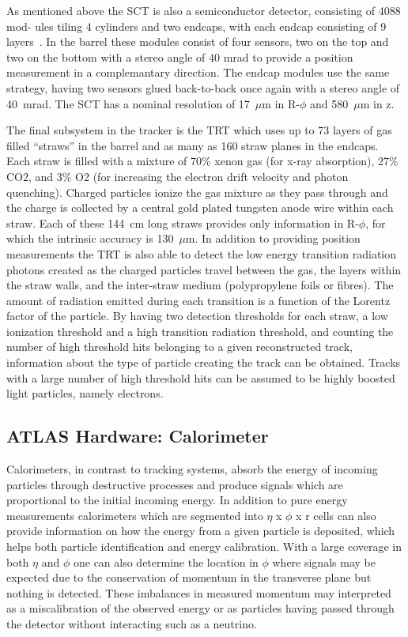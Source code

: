 As mentioned above the SCT is also a semiconductor detector, consisting of 4088 mod- ules tiling 4 cylinders and two endcaps, with each endcap consisting of 9 layers~\cite{JOIATLAS}.  
In the barrel these modules consist of four sensors, two on the top and two on the bottom with a stereo angle of 40 mrad to provide a position measurement in a complemantary direction.  
The endcap modules use the same strategy, having two sensors glued back-to-back once again with a stereo angle of 40~mrad.  
The SCT has a nominal resolution of 17~$\mu$m in R-$\phi$ and 580~$\mu$m in z.  

The final subsystem in the tracker is the TRT which uses up to 73 layers of gas filled ``straws'' in the barrel and as many as 160 straw planes in the endcaps.  
Each straw is filled with a mixture of 70\% xenon gas (for x-ray absorption), 27\% CO2, and 3\% O2 (for increasing the electron drift velocity and photon quenching).  
Charged particles ionize the gas mixture as they pass through and the charge is collected by a central gold plated tungsten anode wire within each straw.  
Each of these 144~cm long straws provides only information in R-$\phi$, for which the intrinsic accuracy is 130~$\mu$m.  
In addition to providing position measurements the TRT is also able to detect the low energy transition radiation photons created as the charged particles travel between the gas, the layers within the straw walls, and the inter-straw medium (polypropylene foils or fibres).  
The amount of radiation emitted during each transition is a function of the Lorentz factor of the particle.  
By having two detection thresholds for each straw, a low ionization threshold and a high transition radiation threshold, and counting the number of high threshold hits belonging to a given reconstructed track, information about the type of particle creating the track can be obtained.  
Tracks with a large number of high threshold hits can be assumed to be highly boosted light particles, namely electrons.  

\subsection{ATLAS Hardware: Calorimeter}
Calorimeters, in contrast to tracking systems, absorb the energy of incoming particles through destructive processes and produce signals which are proportional to the initial incoming energy.  
In addition to pure energy measurements calorimeters which are segmented into $\eta$ x $\phi$ x r cells can also provide information on how the energy from a given particle is deposited, which helps both particle identification and energy calibration.  
With a large coverage in both $\eta$ and $\phi$ one can also determine the location in $\phi$ where signals may be expected due to the conservation of momentum in the transverse plane but nothing is detected.  
These imbalances in measured momentum may interpreted as a miscalibration of the observed energy or as particles having passed through the detector without interacting such as a neutrino.

